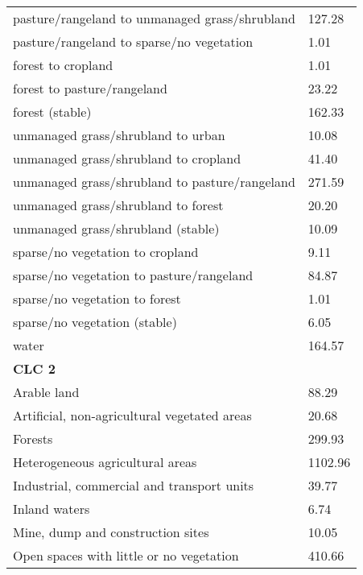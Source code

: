 \begin{longtable}{ll}
pasture/rangeland to unmanaged grass/shrubland     & 127.28           \\
pasture/rangeland to sparse/no vegetation          & 1.01             \\
forest to cropland                                 & 1.01             \\
forest to pasture/rangeland                        & 23.22            \\
forest (stable)                                    & 162.33           \\
unmanaged grass/shrubland to urban                 & 10.08            \\
unmanaged grass/shrubland to cropland              & 41.40            \\
unmanaged grass/shrubland to pasture/rangeland     & 271.59           \\
unmanaged grass/shrubland to forest                & 20.20            \\
unmanaged grass/shrubland (stable)                 & 10.09            \\
sparse/no vegetation to cropland                   & 9.11             \\
sparse/no vegetation to pasture/rangeland          & 84.87            \\
sparse/no vegetation to forest                     & 1.01             \\
sparse/no vegetation (stable)                      & 6.05             \\
water                                              & 164.57           \\
\textbf{CLC 2}                                     &                  \\
Arable land                                        & 88.29            \\
Artificial, non-agricultural vegetated areas       & 20.68            \\
Forests                                            & 299.93           \\
Heterogeneous agricultural areas                   & 1102.96          \\
Industrial, commercial and transport units         & 39.77            \\
Inland waters                                      & 6.74             \\
Mine, dump and construction sites                  & 10.05            \\
Open spaces with little or no vegetation           & 410.66           \\

\end{longtable}
